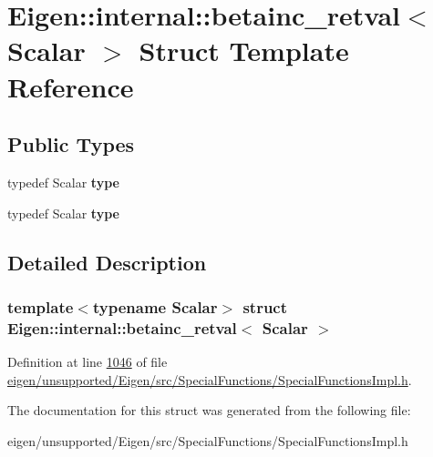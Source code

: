 \hypertarget{struct_eigen_1_1internal_1_1betainc__retval}{}\section{Eigen\+:\+:internal\+:\+:betainc\+\_\+retval$<$ Scalar $>$ Struct Template Reference}
\label{struct_eigen_1_1internal_1_1betainc__retval}
\subsection*{Public Types}
\begin{DoxyCompactItemize}
\item 
\mbox{\label{struct_eigen_1_1internal_1_1betainc__retval_ab10abeb9a119577af3f980bb445348bd}} 
typedef Scalar {\bfseries type}
\item 
\mbox{\label{struct_eigen_1_1internal_1_1betainc__retval_ab10abeb9a119577af3f980bb445348bd}} 
typedef Scalar {\bfseries type}
\end{DoxyCompactItemize}


\subsection{Detailed Description}
\subsubsection*{template$<$typename Scalar$>$\newline
struct Eigen\+::internal\+::betainc\+\_\+retval$<$ Scalar $>$}



Definition at line \hyperlink{eigen_2unsupported_2_eigen_2src_2_special_functions_2_special_functions_impl_8h_source_l01046}{1046} of file \hyperlink{eigen_2unsupported_2_eigen_2src_2_special_functions_2_special_functions_impl_8h_source}{eigen/unsupported/\+Eigen/src/\+Special\+Functions/\+Special\+Functions\+Impl.\+h}.



The documentation for this struct was generated from the following file\+:\begin{DoxyCompactItemize}
\item 
eigen/unsupported/\+Eigen/src/\+Special\+Functions/\+Special\+Functions\+Impl.\+h\end{DoxyCompactItemize}

